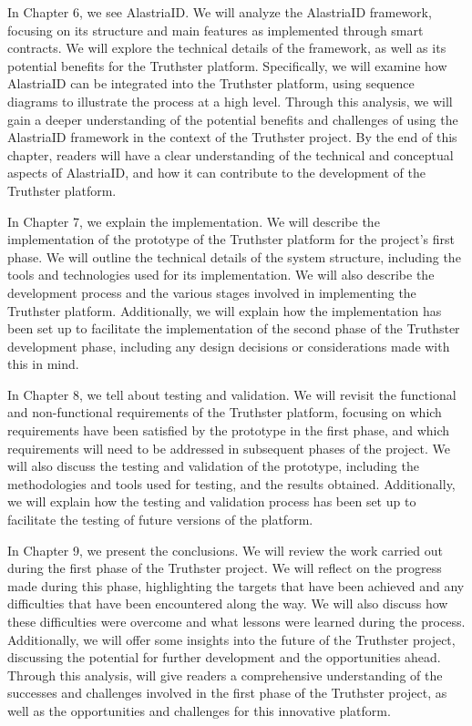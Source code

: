 \documentclass[target=mst,aauheader=]{thud}
\begin{document}
    In Chapter 6, we see AlastriaID. We will analyze the AlastriaID framework, focusing on its structure and main features as implemented through smart contracts. We will explore the technical details of the framework, as well as its potential benefits for the Truthster platform. Specifically, we will examine how AlastriaID can be integrated into the Truthster platform, using sequence diagrams to illustrate the process at a high level. Through this analysis, we will gain a deeper understanding of the potential benefits and challenges of using the AlastriaID framework in the context of the Truthster project. By the end of this chapter, readers will have a clear understanding of the technical and conceptual aspects of AlastriaID, and how it can contribute to the development of the Truthster platform.
    
    In Chapter 7, we explain the implementation. We will describe the implementation of the prototype of the Truthster platform for the project's first phase. We will outline the technical details of the system structure, including the tools and technologies used for its implementation. We will also describe the development process and the various stages involved in implementing the Truthster platform. Additionally, we will explain how the implementation has been set up to facilitate the implementation of the second phase of the Truthster development phase, including any design decisions or considerations made with this in mind.
    
    In Chapter 8, we tell about testing and validation. We will revisit the functional and non-functional requirements of the Truthster platform, focusing on which requirements have been satisfied by the prototype in the first phase, and which requirements will need to be addressed in subsequent phases of the project. We will also discuss the testing and validation of the prototype, including the methodologies and tools used for testing, and the results obtained. Additionally, we will explain how the testing and validation process has been set up to facilitate the testing of future versions of the platform.
    
    In Chapter 9, we present the conclusions. We will review the work carried out during the first phase of the Truthster project. We will reflect on the progress made during this phase, highlighting the targets that have been achieved and any difficulties that have been encountered along the way. We will also discuss how these difficulties were overcome and what lessons were learned during the process. Additionally, we will offer some insights into the future of the Truthster project, discussing the potential for further development and the opportunities ahead. Through this analysis, will give readers a comprehensive understanding of the successes and challenges involved in the first phase of the Truthster project, as well as the opportunities and challenges for this innovative platform.
\end{document}
